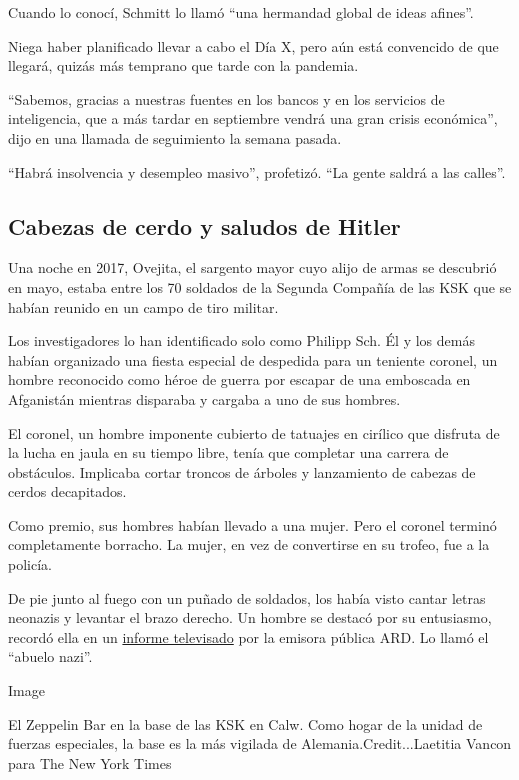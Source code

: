 Cuando lo conocí, Schmitt lo llamó ``una hermandad global de ideas
afines''.

Niega haber planificado llevar a cabo el Día X, pero aún está convencido
de que llegará, quizás más temprano que tarde con la pandemia.

``Sabemos, gracias a nuestras fuentes en los bancos y en los servicios
de inteligencia, que a más tardar en septiembre vendrá una gran crisis
económica'', dijo en una llamada de seguimiento la semana pasada.

``Habrá insolvencia y desempleo masivo'', profetizó. ``La gente saldrá a
las calles''.

\hypertarget{cabezas-de-cerdo-y-saludos-de-hitler}{%
\subsection{Cabezas de cerdo y saludos de
Hitler}\label{cabezas-de-cerdo-y-saludos-de-hitler}}

Una noche en 2017, Ovejita, el sargento mayor cuyo alijo de armas se
descubrió en mayo, estaba entre los 70 soldados de la Segunda Compañía
de las KSK que se habían reunido en un campo de tiro militar.

Los investigadores lo han identificado solo como Philipp Sch. Él y los
demás habían organizado una fiesta especial de despedida para un
teniente coronel, un hombre reconocido como héroe de guerra por escapar
de una emboscada en Afganistán mientras disparaba y cargaba a uno de sus
hombres.

El coronel, un hombre imponente cubierto de tatuajes en cirílico que
disfruta de la lucha en jaula en su tiempo libre, tenía que completar
una carrera de obstáculos. Implicaba cortar troncos de árboles y
lanzamiento de cabezas de cerdos decapitados.

Como premio, sus hombres habían llevado a una mujer. Pero el coronel
terminó completamente borracho. La mujer, en vez de convertirse en su
trofeo, fue a la policía.

De pie junto al fuego con un puñado de soldados, los había visto cantar
letras neonazis y levantar el brazo derecho. Un hombre se destacó por su
entusiasmo, recordó ella en un
\href{https://daserste.ndr.de/panorama/archiv/2017/Hitlergruss-Ermittlungen-gegen-Kompaniechef,bundeswehr1738.html}{informe
televisado} por la emisora pública ARD. Lo llamó el ``abuelo nazi''.

Image

El Zeppelin Bar en la base de las KSK en Calw. Como hogar de la unidad
de fuerzas especiales, la base es la más vigilada de
Alemania.Credit...Laetitia Vancon para The New York Times

